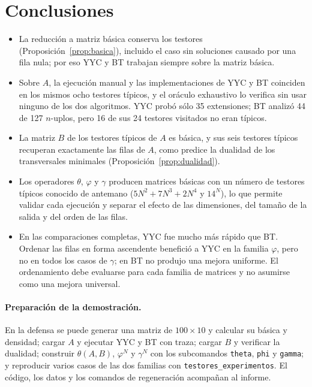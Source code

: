 \documentclass[11pt, a4paper]{article}
\theoremstyle{definition}
\theoremstyle{plain}
\begin{document}


\section{Conclusiones}

\begin{itemize}
\item La reducción a matriz básica conserva los testores
  (Proposición~\ref{prop:basica}), incluido el caso sin soluciones causado por una
  fila nula; por eso YYC y BT trabajan siempre sobre la matriz básica.
\item Sobre $A$, la ejecución manual y las implementaciones de YYC y BT coinciden en
  los mismos ocho testores típicos, y el oráculo exhaustivo lo verifica sin usar
  ninguno de los dos algoritmos. YYC probó sólo 35 extensiones; BT analizó 44 de 127
  $n$-uplos, pero 16 de sus 24 testores visitados no eran típicos.
\item La matriz $B$ de los testores típicos de $A$ es básica, y sus seis testores
  típicos recuperan exactamente las filas de $A$, como predice la dualidad de los
  transversales minimales (Proposición~\ref{prop:dualidad}).
\item Los operadores $\theta$, $\varphi$ y $\gamma$ producen matrices básicas con un
  número de testores típicos conocido de antemano ($5N^2+7N^3+2N^4$ y $14^N$), lo
  que permite validar cada ejecución y separar el efecto de las dimensiones, del
  tamaño de la salida y del orden de las filas.
\item En las comparaciones completas, YYC fue mucho más rápido que BT. Ordenar las
  filas en forma ascendente benefició a YYC en la familia $\varphi$, pero no en
  todos los casos de $\gamma$; en BT no produjo una mejora uniforme. El
  ordenamiento debe evaluarse para cada familia de matrices y no asumirse como una
  mejora universal.
\end{itemize}

\paragraph{Preparación de la demostración.} En la defensa se puede generar una
matriz de $100\times10$ y calcular su básica y densidad; cargar $A$ y ejecutar YYC
y BT con traza; cargar $B$ y verificar la dualidad; construir $\theta(A,B)$,
$\varphi^N$ y $\gamma^N$ con los subcomandos \texttt{theta}, \texttt{phi} y
\texttt{gamma}; y reproducir varios casos de las dos familias con
\texttt{testores\_experimentos}. El código, los datos y los comandos de
regeneración acompañan al informe.
\end{document}
